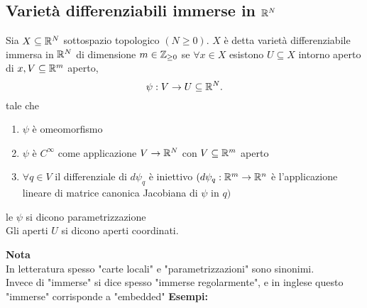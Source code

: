 \documentclass[12px]{article}
\begin{document}
\subsection{Varietà differenziabili immerse in  $\mathbb{R}^N$ }
\begin{defi}
	Sia $X\subseteq\mathbb{R}^N$ sottospazio topologico $(N\geq 0)$. $X$ è detta varietà differenziabile immersa in  $\mathbb{R}^N$ di dimensione  $m\in\mathbb{Z}_{\geq 0}$ se $\forall x\in X$ esistono  $U\subseteq X$ intorno aperto di  $x, V\subseteq\mathbb{R}^m$ aperto,
	 \[
	\psi : V \rightarrow U\subseteq \mathbb{R}^N
	.\] 
	tale che 
	\begin{enumerate}
		\item 	$\psi$ è omeomorfismo
		\item $\psi $ è  $C^\infty$ come applicazione  $V \rightarrow \mathbb{R}^N$ con $V\subseteq \mathbb{R}^m$ aperto 
		\item $\forall q\in V$ il differenziale di  $d\psi_q$ è iniettivo
				 $(d\psi_q: \mathbb{R}^m \rightarrow \mathbb{R}^n$ è l'applicazione lineare di matrice canonica Jacobiana di $\psi$ in $q)$
	\end{enumerate}
	le $\psi$ si dicono parametrizzazione\\
	Gli aperti  $U$ si dicono aperti coordinati.\\
\end{defi}
\textbf{Nota}\\
	In letteratura spesso "carte locali" e "parametrizzazioni" sono sinonimi.\\
	Invece di "immerse" si dice spesso "immerse regolarmente", e in inglese questo "immerse" corrisponde a "embedded"
\textbf{Esempi:}\\
\end{document}
